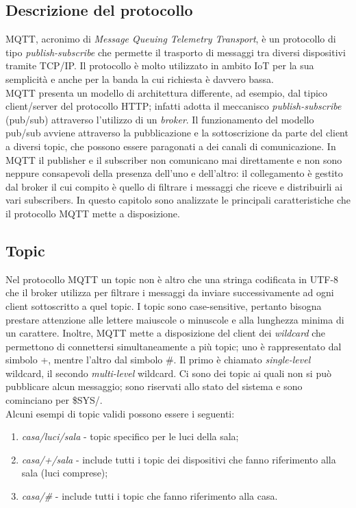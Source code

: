 \documentclass[binding=0.6cm,TFA]{sapthesis}
\begin{document}
\begin{large}

\section{Descrizione del protocollo}

MQTT, acronimo di \textit{Message Queuing Telemetry Transport}, è un protocollo di tipo \textit{publish-subscribe} che permette il trasporto di messaggi tra diversi dispositivi tramite TCP/IP. Il protocollo è molto utilizzato in ambito IoT per la sua semplicità e anche per la banda la cui richiesta è davvero bassa. \\

MQTT presenta un modello di architettura differente, ad esempio, dal tipico client/server del protocollo HTTP; infatti adotta il meccanisco \textit{publish-subscribe} (pub/sub) attraverso l'utilizzo di un \textit{broker}. Il funzionamento del modello pub/sub avviene attraverso la pubblicazione e la sottoscrizione da parte del client a diversi topic, che possono essere paragonati a dei canali di comunicazione. In MQTT il publisher e il subscriber non comunicano mai direttamente e non sono neppure consapevoli della presenza dell'uno e dell'altro: il collegamento è gestito dal broker il cui compito è quello di filtrare i messaggi che riceve e distribuirli ai vari subscribers. 
In questo capitolo sono analizzate le principali caratteristiche che il protocollo MQTT mette a disposizione.

\subsection{Topic}
Nel protocollo MQTT un topic non è altro che una stringa codificata in UTF-8 che il broker utilizza per filtrare i messaggi da inviare successivamente ad ogni client sottoscritto a quel topic. I topic sono case-sensitive, pertanto bisogna prestare attenzione alle lettere maiuscole o minuscole e alla lunghezza minima di un carattere. Inoltre, MQTT mette a disposizione del client dei \textit{wildcard} che permettono di connettersi simultaneamente a più topic; uno è rappresentato dal simbolo +, mentre l'altro dal simbolo \#. Il primo è chiamato \textit{single-level} wildcard, il secondo \textit{multi-level} wildcard. Ci sono dei topic ai quali non si può pubblicare alcun messaggio; sono riservati allo stato del sistema e sono cominciano per \$SYS/. \\
Alcuni esempi di topic validi possono essere i seguenti: 
\begin{enumerate}
\item \textit{casa/luci/sala} - topic specifico per le luci della sala;
\item \textit{casa/+/sala} - include tutti i topic dei dispositivi che fanno riferimento alla sala (luci comprese);
\item \textit{casa/\#} - include tutti i topic che fanno riferimento alla casa.
\end{enumerate}



\end{large}
\end{document}
